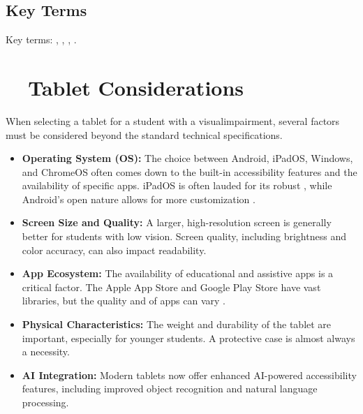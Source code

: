 \subsection{Key Terms}\label{chap2:key-terms}
Key terms: , , , .

\section{~~Tablet Considerations}\label{ch2:sec:tablet-considerations}

When selecting a \gls{tablet} for a student with a \gls{visualimpairment}, several factors must be considered beyond the standard technical specifications.

\begin{itemize}
	\item \textbf{Operating System (OS):} The choice between Android, iPadOS, Windows, and ChromeOS often comes down to the built-in accessibility features and the availability of specific apps. iPadOS is often lauded for its robust   \supercite{AppleVoiceOver, AFBiOS}, while Android's open nature allows for more customization \supercite{AndroidAccessibility, GoogleTalkBack, SamsungAccessibility}.
	\item \textbf{Screen Size and Quality:} A larger, high-resolution screen is generally better for students with low vision. Screen quality, including brightness and color accuracy, can also impact readability.\supercite{AFBiOS, AAOTechnologyTools, BOIAScreenMagnifiers}
	\item \textbf{App Ecosystem:} The availability of educational and assistive apps is a critical factor. The Apple App Store and Google Play Store have vast libraries, but the quality and  of apps can vary \supercite{AAOApps, Bookshare, VoiceDreamReader}.
	\item \textbf{Physical Characteristics:} The weight and durability of the tablet are important, especially for younger students. A protective case is almost always a necessity.\supercite{Day2021, Holbrook2006}
	\item \textbf{AI Integration:} Modern tablets now offer enhanced AI-powered accessibility features, including improved object recognition and natural language processing.\supercite{HIMSReleaseNotes, Android16Release, msseeingai, envision}
\end{itemize}

